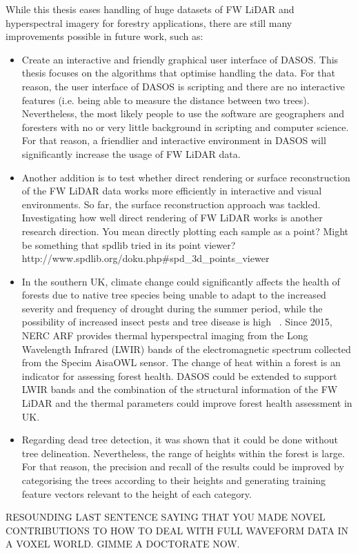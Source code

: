 \documentclass{subfiles}
\begin{document}
{\color{blue}
\par While this thesis eases handling of huge datasets of FW LiDAR and hyperspectral imagery for forestry applications, there are still many improvements possible in future work, such as:
\begin{itemize}
	\item Create an interactive and friendly graphical user interface of DASOS. This thesis focuses on the algorithms that optimise handling the data. For that reason, the user interface of DASOS is scripting and there are no interactive features (i.e. being able to measure the distance between two trees). Nevertheless, the most likely people to use the software are geographers and foresters with no or very little background in scripting and computer science. For that reason, a friendlier and interactive environment in DASOS will significantly increase the usage of FW LiDAR data.  
	\item Another addition is to test whether direct rendering or surface reconstruction of the FW LiDAR data works more efficiently in interactive and visual environments. So far, the surface reconstruction approach was tackled. Investigating how well direct rendering of FW LiDAR works is another research direction. {\color{pink}You mean directly plotting each sample as a point?  Might be something that spdlib tried in its point viewer? http://www.spdlib.org/doku.php#spd_3d_points_viewer }
	\item In the southern UK, climate change could significantly affects the health of forests due to native tree species being unable to adapt to the increased severity and frequency of drought during the summer period, while the possibility of increased insect pests and tree disease is high ~\cite{Read2009}.  Since 2015, NERC ARF provides thermal hyperspectral imaging from the Long Wavelength Infrared (LWIR) bands of the electromagnetic spectrum collected from the Specim AisaOWL sensor. The change of heat within a forest is an indicator for assessing forest health. DASOS could be extended to support LWIR bands and the combination of the structural information of the FW LiDAR and the thermal parameters could improve forest health assessment in UK.  	
	\item Regarding dead tree detection, it was shown that it could be done without tree delineation. Nevertheless, the range of heights within the forest is large. For that reason, the precision and recall of the results could be improved by categorising the trees according to their heights and generating training feature vectors relevant to the height of each category. 
	
\end{itemize}



\par 


\par 
}
RESOUNDING LAST SENTENCE SAYING THAT YOU MADE NOVEL CONTRIBUTIONS TO HOW TO DEAL WITH FULL WAVEFORM DATA IN A VOXEL WORLD.  GIMME A DOCTORATE NOW.
\end{document}
